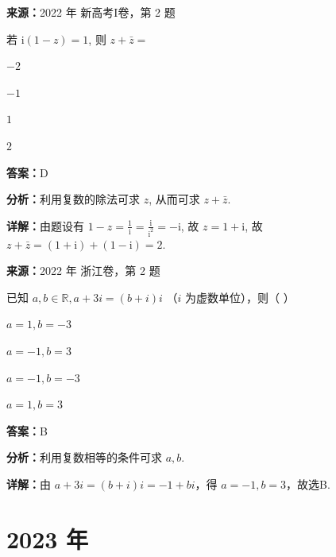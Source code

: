\begin{question}[points=5]
\textbf{来源：}2022 年 新高考I卷，第 2 题\par
若 $\mathrm{i}(1 - z) = 1$, 则 $z + \bar{z} =$
\begin{choices}
  \item $-2$
  \item $-1$
  \item $1$
  \item $2$
\end{choices}
\begin{solution}
\textbf{答案：}D

\textbf{分析：}利用复数的除法可求 $z$, 从而可求 $z + \bar{z}$.

\textbf{详解：}由题设有 $1 - z = \frac{1}{\mathrm{i}} = \frac{\mathrm{i}}{\mathrm{i}^2} = -\mathrm{i}$, 故 $z = 1 + \mathrm{i}$, 故 $z + \bar{z} = (1 + \mathrm{i}) + (1 - \mathrm{i}) = 2$.
\end{solution}
\end{question}

\begin{question}[points=4]
\textbf{来源：}2022 年 浙江卷，第 2 题\par
已知 $a,b \in \mathbb{R}, a+3i = (b+i)i$ （$i$ 为虚数单位），则（ ）
\begin{choices}
  \item $a = 1, b = -3$
  \item $a = -1, b = 3$
  \item $a = -1, b = -3$
  \item $a = 1, b = 3$
\end{choices}
\begin{solution}
\textbf{答案：}B

\textbf{分析：}利用复数相等的条件可求 $a,b$.

\textbf{详解：}由 $a+3i = (b+i)i = -1 + bi$，得 $a = -1, b = 3$，故选B.
\end{solution}
\end{question}

\section*{2023 年}

